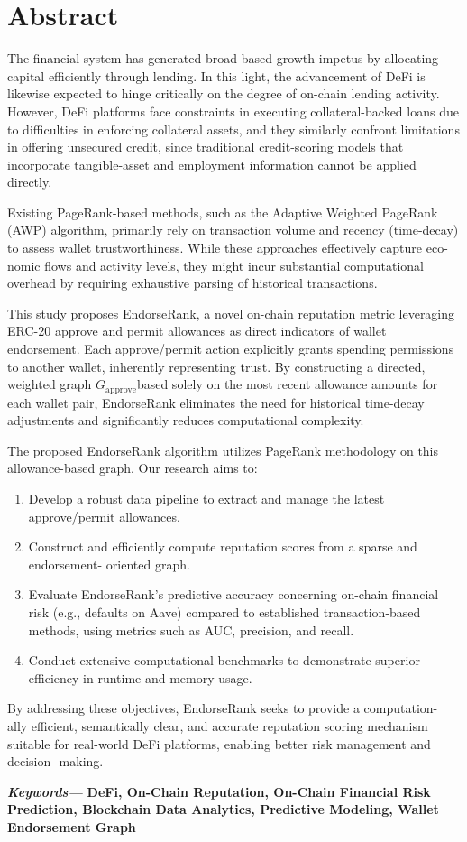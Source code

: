 \section*{Abstract}
\label{sec:abstract}

The financial system has generated broad-based growth impetus by allocating capital efficiently through lending. In this light, the advancement of DeFi is likewise expected to hinge critically on the degree of on-chain lending activity. However, DeFi platforms face constraints in executing collateral-backed loans due to difficulties in enforcing collateral assets, and they similarly confront limitations in offering unsecured credit, since traditional credit-scoring models that incorporate tangible-asset and employment information cannot be applied directly.


Existing PageRank-based methods, such as the Adaptive Weighted PageRank (AWP) algorithm, primarily rely on transaction volume and recency (time-decay) to assess wallet trustworthiness. While these approaches effectively capture eco- nomic flows and activity levels, they might incur substantial computational overhead by requiring exhaustive parsing of historical transactions.


This study proposes EndorseRank, a novel on-chain reputation metric leveraging ERC-20 approve and permit allowances as direct indicators of wallet endorsement. Each approve/permit action explicitly grants spending permissions to another wallet, inherently representing trust. By constructing a directed, weighted graph $G_{\text{approve}}$based solely on the most recent allowance amounts for each wallet pair, EndorseRank eliminates the need for historical time-decay adjustments and significantly reduces computational complexity.


The proposed EndorseRank algorithm utilizes PageRank methodology on this allowance-based graph. Our research aims to:


\begin{enumerate}
\item[1.] Develop a robust data pipeline to extract and manage the latest approve/permit allowances.
\item[2.] Construct and efficiently compute reputation scores from a sparse and endorsement- oriented graph.
\item[3.] Evaluate EndorseRank's predictive accuracy concerning on-chain financial risk (e.g., defaults on Aave) compared to established transaction-based methods, using metrics such as AUC, precision, and recall.
\item[4.] Conduct extensive computational benchmarks to demonstrate superior efficiency in runtime and memory usage.
\end{enumerate}
By addressing these objectives, EndorseRank seeks to provide a computation- ally efficient, semantically clear, and accurate reputation scoring mechanism suitable for real-world DeFi platforms, enabling better risk management and decision- making.


\textbf{\emph{Keywords--- }}\textbf{DeFi, On-Chain Reputation, On-Chain Financial Risk Prediction, Blockchain Data Analytics, Predictive Modeling, Wallet Endorsement Graph}
